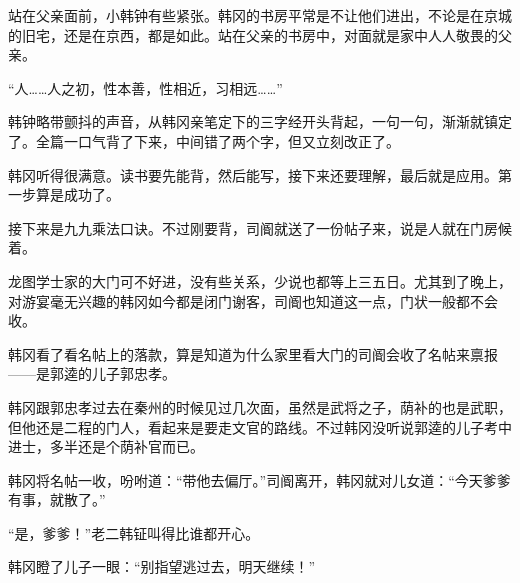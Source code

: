 站在父亲面前，小韩钟有些紧张。韩冈的书房平常是不让他们进出，不论是在京城的旧宅，还是在京西，都是如此。站在父亲的书房中，对面就是家中人人敬畏的父亲。

“人……人之初，性本善，性相近，习相远……”

韩钟略带颤抖的声音，从韩冈亲笔定下的三字经开头背起，一句一句，渐渐就镇定了。全篇一口气背了下来，中间错了两个字，但又立刻改正了。

韩冈听得很满意。读书要先能背，然后能写，接下来还要理解，最后就是应用。第一步算是成功了。

接下来是九九乘法口诀。不过刚要背，司阍就送了一份帖子来，说是人就在门房候着。

龙图学士家的大门可不好进，没有些关系，少说也都等上三五日。尤其到了晚上，对游宴毫无兴趣的韩冈如今都是闭门谢客，司阍也知道这一点，门状一般都不会收。

韩冈看了看名帖上的落款，算是知道为什么家里看大门的司阍会收了名帖来禀报——是郭逵的儿子郭忠孝。

韩冈跟郭忠孝过去在秦州的时候见过几次面，虽然是武将之子，荫补的也是武职，但他还是二程的门人，看起来是要走文官的路线。不过韩冈没听说郭逵的儿子考中进士，多半还是个荫补官而已。

韩冈将名帖一收，吩咐道：“带他去偏厅。”司阍离开，韩冈就对儿女道：“今天爹爹有事，就散了。”

“是，爹爹！”老二韩钲叫得比谁都开心。

韩冈瞪了儿子一眼：“别指望逃过去，明天继续！”

